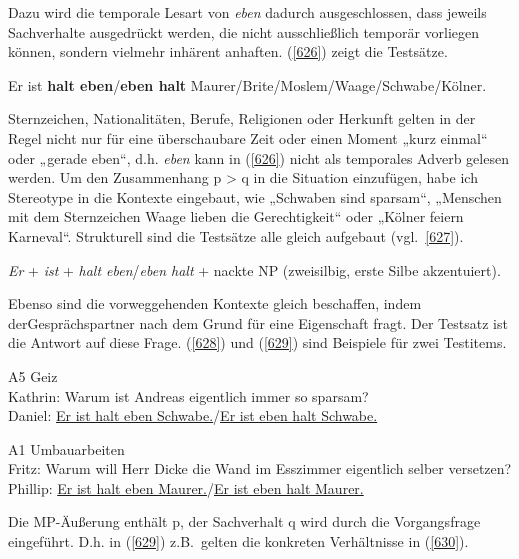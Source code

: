 Dazu wird die temporale Lesart von \textit{eben} dadurch ausgeschlossen, dass jeweils Sachverhalte ausgedrückt werden, die nicht ausschließlich temporär vorliegen können, sondern vielmehr inhärent anhaften. (\ref{626}) zeigt die Testsätze.

\begin{exe}
	\ex\label{626} 
	 Er ist \textbf{halt eben}\slash\textbf{eben halt} Maurer/Brite/Moslem/Waage/Schwabe/Kölner.
\end{exe}
Sternzeichen, Nationalitäten, Berufe, Religionen oder Herkunft gelten in der Regel nicht nur für eine überschaubare Zeit oder einen Moment „kurz einmal“ oder „gerade eben“, d.h. \textit{eben} kann in (\ref{626}) nicht als temporales Adverb gelesen werden. Um den Zusammenhang p > q in die Situation einzufügen, habe ich Stereotype in die Kontexte eingebaut, wie „Schwaben sind sparsam“, „Menschen mit dem Sternzeichen Waage lieben die Gerechtigkeit“ oder „Kölner feiern Karneval“. Strukturell sind die Testsätze alle gleich aufgebaut (vgl.\ \ref{627}).

\begin{exe}
	\ex\label{627} 
	 \textit{Er} + \textit{ist} + \textit{halt eben}/\textit{eben halt} + nackte NP (zweisilbig, erste Silbe akzentuiert).
\end{exe}	
Ebenso sind die vorweggehenden Kontexte gleich beschaffen, indem der\linebreak Gesprächspartner nach dem Grund für eine Eigenschaft fragt. Der Testsatz ist die Antwort auf diese Frage. (\ref{628}) und (\ref{629}) sind Beispiele für zwei Testitems.

\begin{exe}
	\ex\label{628} 
	 A5 Geiz\\
	Kathrin: Warum ist Andreas eigentlich immer so sparsam?\\
	Daniel: \ul{Er ist halt eben Schwabe.}/\ul{Er ist eben halt Schwabe.}
\end{exe}	

\begin{exe}
	\ex\label{629} 
	A1 Umbauarbeiten\\
	Fritz: Warum will Herr Dicke die Wand im Esszimmer eigentlich selber versetzen?\\
	Phillip: \ul{Er ist halt eben Maurer.}/\ul{Er ist eben halt Maurer.}
\end{exe}	
Die MP-Äußerung enthält p, der Sachverhalt q wird durch die Vorgangsfrage eingeführt. D.h. in (\ref{629}) z.B.\ gelten die konkreten Verhältnisse in (\ref{630}).

